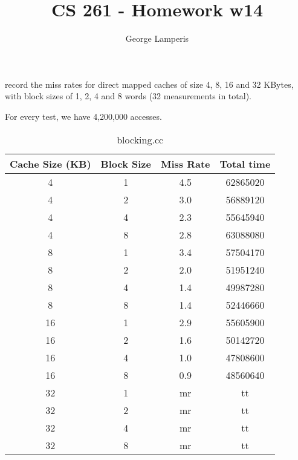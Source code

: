 \documentclass[letterpaper, 12pt, oneside]{memoir}
\title{CS 261 - Homework w14}
\author{George Lamperis}
\date{}
\begin{document}
\maketitle

record the miss rates for direct mapped caches of size 4, 8, 16 and 32 KBytes,
with block sizes of 1, 2, 4 and 8 words (32 measurements in total). 

For every test, we have 4,200,000 accesses.
\begin{table}[H]
\centering
\begin{tabular}{c|c|c|c}
    Cache Size (KB)  & Block Size & Miss Rate & Total time \\ \hline 
    4  & 1 & 4.5    & 62865020 \\
    4  & 2 & 3.0    & 56889120 \\
    4  & 4 & 2.3    & 55645940 \\
    4  & 8 & 2.8    & 63088080 \\ \hline
    8  & 1 & 3.4    & 57504170 \\
    8  & 2 & 2.0    & 51951240 \\
    8  & 4 & 1.4    & 49987280 \\
    8  & 8 & 1.4    & 52446660 \\ \hline
    16 & 1 & 2.9    & 55605900 \\
    16 & 2 & 1.6    & 50142720 \\
    16 & 4 & 1.0    & 47808600 \\
    16 & 8 & 0.9    & 48560640 \\ \hline
    32 & 1 & mr & tt \\
    32 & 2 & mr & tt \\
    32 & 4 & mr & tt \\
    32 & 8 & mr & tt \\
\end{tabular}
\caption{blocking.cc}
\end{table}
\end{document}
